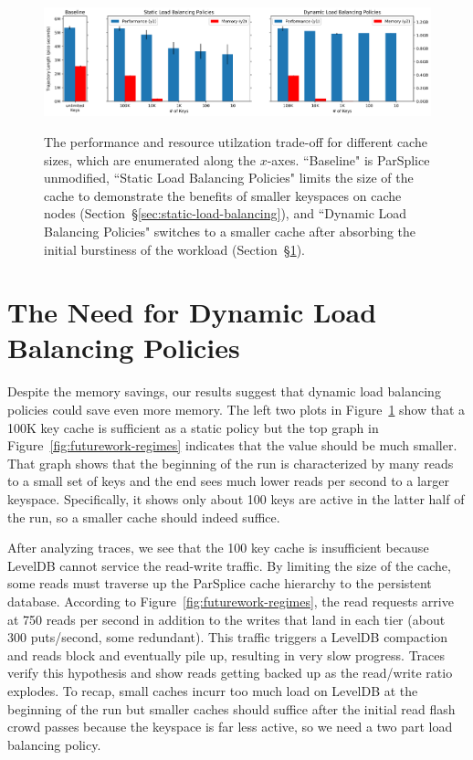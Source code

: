 \begin{figure}[tbh]
  \noindent\includegraphics[width=1\textwidth]{figures/methodology-tradeoff.png}\\
  \caption{The performance and resource utilzation trade-off for different
  cache sizes, which are enumerated along the \(x\)-axes. ``Baseline" is
  ParSplice unmodified, ``Static Load Balancing Policies" limits the size of the
  cache to demonstrate the benefits of smaller keyspaces on cache nodes
  (Section~\S\ref{sec:static-load-balancing}), and ``Dynamic Load Balancing
  Policies" switches to a smaller cache after absorbing the initial burstiness of
  the workload
  (Section~\S\ref{sec:the-need-for-dynamic-load-balancing-policies}).
  \label{fig:methodology-tradeoff}}
\end{figure}

\section{The Need for Dynamic Load Balancing Policies}
\label{sec:the-need-for-dynamic-load-balancing-policies}

Despite the memory savings, our results suggest that dynamic load balancing
policies could save even more memory.  The left two plots in
Figure~\ref{fig:methodology-tradeoff} show that a 100K key cache is sufficient
as a static policy but the top graph in Figure~\ref{fig:futurework-regimes}
indicates that the value should be much smaller. That graph shows that the
beginning of the run is characterized by many reads to a small set of keys and
the end sees much lower reads per second to a larger keyspace. Specifically, it
shows only about 100 keys are active in the latter half of the run, so a
smaller cache should indeed suffice. 

After analyzing traces, we see that the 100 key cache is insufficient because
LevelDB cannot service the read-write traffic. By limiting the size of the
cache, some reads must traverse up the ParSplice cache hierarchy to the
persistent database.  According to Figure~\ref{fig:futurework-regimes}, the
read requests arrive at 750 reads per second in addition to the writes that
land in each tier (about 300 puts/second, some redundant). This traffic
triggers a LevelDB compaction and reads block and eventually pile up, resulting
in very slow progress. Traces verify this hypothesis and show reads getting
backed up as the read/write ratio explodes. To recap, small caches incurr too
much load on LevelDB at the beginning of the run but smaller caches should
suffice after the initial read flash crowd passes because the keyspace is far
less active, so we need a two part load balancing policy.

